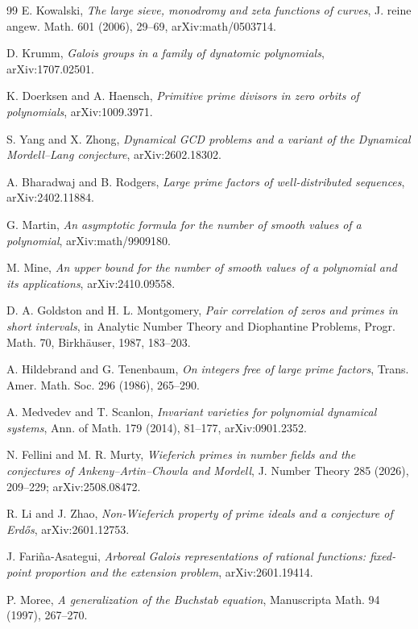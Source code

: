 \documentclass[11pt]{article}
\begin{document}
\begin{thebibliography}{99}
 E. Kowalski,
\emph{The large sieve, monodromy and zeta functions of curves},
J. reine angew. Math. 601 (2006), 29--69, arXiv:math/0503714.

 D. Krumm,
\emph{Galois groups in a family of dynatomic polynomials}, arXiv:1707.02501.

 K. Doerksen and A. Haensch,
\emph{Primitive prime divisors in zero orbits of polynomials}, arXiv:1009.3971.

 S. Yang and X. Zhong,
\emph{Dynamical GCD problems and a variant of the Dynamical Mordell--Lang conjecture},
arXiv:2602.18302.

 A. Bharadwaj and B. Rodgers,
\emph{Large prime factors of well-distributed sequences}, arXiv:2402.11884.

 G. Martin,
\emph{An asymptotic formula for the number of smooth values of a polynomial},
arXiv:math/9909180.

 M. Mine,
\emph{An upper bound for the number of smooth values of a polynomial and its applications},
arXiv:2410.09558.

 D. A. Goldston and H. L. Montgomery,
\emph{Pair correlation of zeros and primes in short intervals},
in Analytic Number Theory and Diophantine Problems, Progr. Math. 70,
Birkh\"auser, 1987, 183--203.

 A. Hildebrand and G. Tenenbaum,
\emph{On integers free of large prime factors},
Trans. Amer. Math. Soc. 296 (1986), 265--290.

 A. Medvedev and T. Scanlon,
\emph{Invariant varieties for polynomial dynamical systems},
Ann. of Math. 179 (2014), 81--177, arXiv:0901.2352.


 N. Fellini and M. R. Murty,
\emph{Wieferich primes in number fields and the conjectures of
Ankeny--Artin--Chowla and Mordell}, J. Number Theory 285 (2026), 209--229;
arXiv:2508.08472.

 R. Li and J. Zhao,
\emph{Non-Wieferich property of prime ideals and a conjecture of Erd\H{o}s},
arXiv:2601.12753.

 J. Fari\~na-Asategui,
\emph{Arboreal Galois representations of rational functions: fixed-point proportion
and the extension problem}, arXiv:2601.19414.

 P. Moree,
\emph{A generalization of the Buchstab equation}, Manuscripta Math. 94 (1997), 267--270.
\end{thebibliography}
\end{document}

